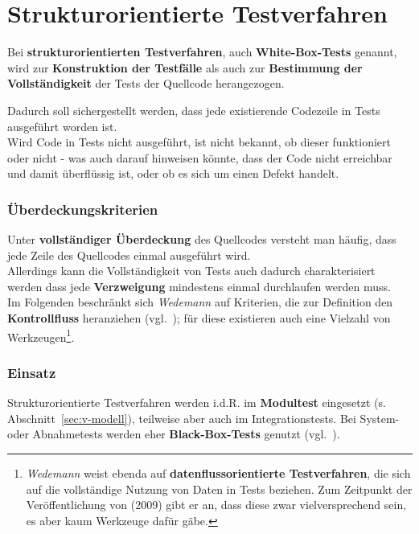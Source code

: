\section{Strukturorientierte Testverfahren}
\begin{tcolorbox}
Bei \textbf{strukturorientierten Testverfahren}, auch \textbf{White-Box-Tests} genannt, wird zur \textbf{Konstruktion der Testfälle} als auch zur \textbf{Bestimmung der Vollständigkeit} der Tests der Quellcode herangezogen.
\end{tcolorbox}

\noindent
Dadurch soll sichergestellt werden, dass jede existierende Codezeile in Tests ausgeführt worden ist.\\
Wird Code in Tests nicht ausgeführt, ist nicht bekannt, ob dieser funktioniert oder nicht - was auch darauf hinweisen könnte, dass der Code nicht erreichbar und damit überflüssig ist, oder ob es sich um einen Defekt handelt.

\subsubsection*{Überdeckungskriterien}
Unter \textbf{vollständiger Überdeckung} des Quellcodes versteht man häufig, dass jede Zeile des Quellcodes einmal ausgeführt wird.\\
Allerdings kann die Vollständigkeit von Tests auch dadurch charakterisiert werden dass jede \textbf{Verzweigung} mindestens einmal durchlaufen werden muss.\\
Im Folgenden beschränkt sich \textit{Wedemann} auf Kriterien, die zur Definition den \textbf{Kontrollfluss} heranziehen (vgl.~\cite[49 f.]{Wed09c}); für diese existieren auch eine Vielzahl von Werkzeugen\footnote{
\textit{Wedemann} weist ebenda auf \textbf{datenflussorientierte Testverfahren}, die sich auf die vollständige Nutzung von Daten in Tests beziehen. Zum Zeitpunkt der Veröffentlichung von \cite{Wed09c} (2009) gibt er an, dass diese zwar vielversprechend sein, es aber kaum Werkzeuge dafür gäbe.
}.

\subsubsection*{Einsatz}
Strukturorientierte Testverfahren werden i.d.R. im \textbf{Modultest} eingesetzt (s. Abschnitt~\ref{sec:v-modell}), teilweise aber auch im Integrationstests.
Bei System- oder Abnahmetests werden eher \textbf{Black-Box-Tests} genutzt (vgl.~\cite[50]{Wed09c}).

